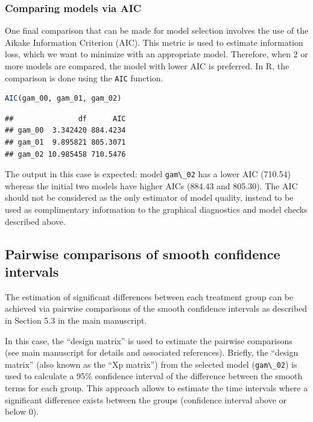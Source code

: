 \documentclass[
]{article}
\newcommand{\passthrough}[1]{#1}
\begin{document}
\hypertarget{comparing-models-via-aic}{%
\subsubsection{Comparing models via AIC}\label{comparing-models-via-aic}}

One final comparison that can be made for model selection involves the use of the Aikake Information Criterion (AIC). This metric is used to estimate information loss, which we want to minimize with an appropriate model. Therefore, when 2 or more models are compared, the model with lower AIC is preferred. In R, the comparison is done using the \passthrough{\lstinline!AIC!} function.

\begin{lstlisting}[language=R]
AIC(gam_00, gam_01, gam_02)
\end{lstlisting}

\begin{lstlisting}
##               df      AIC
## gam_00  3.342420 884.4234
## gam_01  9.895821 805.3071
## gam_02 10.985458 710.5476
\end{lstlisting}

The output in this case is expected: model \passthrough{\lstinline!gam\_02!} has a lower AIC (710.54) whereas the initial two models have higher AICs (884.43 and 805.30). The AIC should not be considered as the only estimator of model quality, instead to be used as complimentary information to the graphical diagnostics and model checks described above.

\hypertarget{pairwise-comparisons-of-smooth-confidence-intervals}{%
\subsection{Pairwise comparisons of smooth confidence intervals}\label{pairwise-comparisons-of-smooth-confidence-intervals}}

The estimation of significant differences between each treatment group can be achieved via pairwise comparisons of the smooth confidence intervals as described in Section 5.3 in the main manuscript.

In this case, the ``design matrix'' is used to estimate the pairwise comparisons (see main manuscript for details and associated references). Briefly, the ``design matrix'' (also known as the ``Xp matrix'') from the selected model (\passthrough{\lstinline!gam\_02!}) is used to calculate a 95\% confidence interval of the difference between the smooth terms for each group. This approach allows to estimate the time intervals where a significant difference exists between the groups (confidence interval above or below 0).
\end{document}
